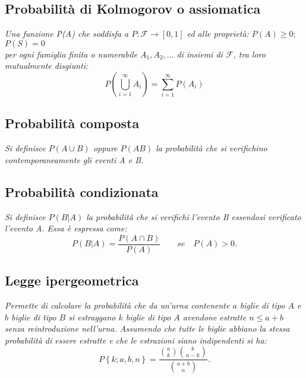 \subsection{Probabilità di Kolmogorov o assiomatica} %
\label{subsec:kolmogorov}
\emph{Una funzione P(A) che soddisfa a $P:\mathcal{F} \longrightarrow [0,1]$ ed alle proprietà: $P(A)\ge 0;$ $P(S)=0$ \\ per ogni famiglia finita o numerabile $A_1 , A_2 , \dots$ di insiemi di $\mathcal{F}$, tra loro mutualmente disgiunti:
\begin{equation}
\label{eq:prob-kolmo}
P\left( \bigcup _{ i=1 }^{ \infty  }{ A_{ i } }  \right) =\sum _{ i=1 }^{ \infty  }{ P\left( A_{ i } \right)  } 
\end{equation}}

\subsection{Probabilità composta} %
\label{subsec:composta}
\emph{Si definisce $P(A\cup B)$ oppure $P(AB)$ la probabilità che si verifichino contemporaneamente gli eventi A e B.}

\subsection{Probabilità condizionata} %
\label{subsec:condizionata}
\emph{Si definisce $P(B|A)$ la probabilità che si verifichi l'evento B essendosi verificato l'evento A. Essa è espressa come:
\begin{equation}
P(B|A)=\frac{P(A\cap B)}{P(A)} \qquad se \quad P(A)>0.
\end{equation}}

\subsection{Legge ipergeometrica} %
\label{subsec:ipergeometrica}
\emph{Permette di calcolare la probabilità che da un'urna contenente $a$ biglie di tipo $A$ e $b$ biglie di tipo $B$ si estraggano $k$ biglie di tipo $A$ avendone estratte $n\le a+b$ senza reintroduzione nell'urna. Assumendo che tutte le biglie abbiano la stessa probabilità di essere estratte e che le estrazioni siano indipendenti si ha:
\begin{equation}
P\left\{ k;a,b,n \right\} =\frac { { a \choose k  }{ b \choose {n-k} } }{ { {a+b} \choose n } } .
\end{equation}}


